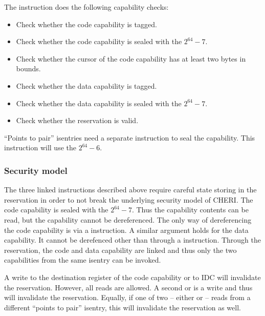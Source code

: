 \begin{enumerate}
  The instruction does the following capability checks:
  \begin{itemize}
    \item Check whether the code capability is tagged.
    \item Check whether the code capability is sealed with the \cotype{} $2^{64} - 7$.
    \item Check whether the cursor of the code capability has at least two bytes in bounds.
    \item Check whether the data capability is tagged.
    \item Check whether the data capability is sealed with the \cotype{} $2^{64} - 7$.
    \item Check whether the reservation is valid.
  \end{itemize}
\end{enumerate}

``Points to pair'' isentries need a separate instruction to seal the capability.
This instruction will use the \cotype{} $2^{64} - 6$.

\subsubsection{Security model}

The three linked instructions described above require careful state storing in the reservation in order to not break the underlying security model of CHERI.
The code capability is sealed with the \cotype{} $2^{64} - 7$.
Thus the capability contents can be read, but the capability cannot be dereferenced.
The only way of dereferencing the code capability is via a  instruction.
A similar argument holds for the data capability.
It cannot be derefenced other than through a  instruction.
Through the reservation, the code and data capability are linked and thus only the two capabilities from the same isentry can be invoked.

A write to the destination register of the code capability or to IDC will invalidate the reservation.
However, all reads are allowed.
A second  or  is a write and thus will invalidate the reservation.
Equally, if one of two -- either  or  -- reads from a different ``points to pair'' isentry, this will invalidate the reservation as well.

%

